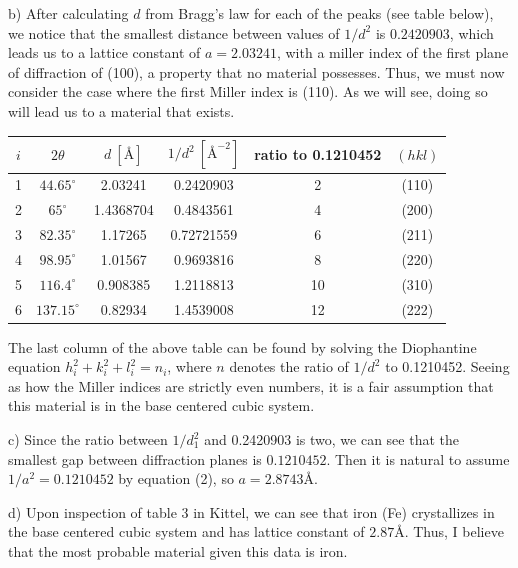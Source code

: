 \documentclass{article}
\begin{document}
b) After calculating $d$ from Bragg's law for each of the peaks (see table below), we notice that the smallest distance between values of $1/d^2$ is $0.2420903$, which leads us to a lattice constant of $a = 2.03241$, with a miller index of the first plane of diffraction of (100), a property that no material possesses. Thus, we must now consider the case where the first Miller index is (110). As we will see, doing so will lead us to a material that exists.
\begin{center}
    \begin{tabular}{c|c|c|c|c|c}
        $i$ & $2\theta$ & $d\: [\text{\AA}]$ & $1/d^2\: [\text{\AA}^{-2}]$  & ratio to 0.1210452 & $(hkl)$ \\
        \hline
        1 & $44.65^{\circ}$ & 2.03241 & 0.2420903 & 2 & (110)\\
        2 & $65^{\circ}$ & 1.4368704 & 0.4843561 & 4 & (200)\\
        3 & $82.35^{\circ}$ & 1.17265 & 0.72721559 & 6 & (211)\\
        4 & $98.95^{\circ}$ & 1.01567 & 0.9693816 & 8 & (220)\\
        5 & $116.4^{\circ}$ & 0.908385 & 1.2118813 & 10 & (310)\\
        6 & $137.15^{\circ}$ & 0.82934 & 1.4539008 & 12 & (222)\\
    \end{tabular}
\end{center}
The last column of the above table can be found by solving the Diophantine equation $h_i^2 + k_i^2 + l_i^2 = n_i$, where $n$ denotes the ratio of $1/d^2$ to 0.1210452. Seeing as how the Miller indices are strictly even numbers, it is a fair assumption that this material is in the base centered cubic system. 
\newline

c) Since the ratio between $1/d_1^2$ and 0.2420903 is two, we can see that the smallest gap between diffraction planes is $0.1210452$. Then it is natural to assume $1/a^2 = 0.1210452$ by equation (2), so $a = 2.8743 \text{\AA}$.
\newline

d) Upon inspection of table 3 in Kittel, we can see that iron (Fe) crystallizes in the base centered cubic system and has lattice constant of $2.87 \text{\AA}$. Thus, I believe that the most probable material given this data is iron.
\end{document}
